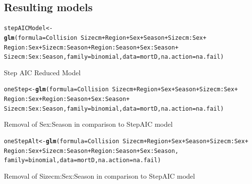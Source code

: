 \documentclass{article}\usepackage[]{graphicx}\usepackage[]{color}
\makeatletter
\newcommand{\hlopt}[1]{\textcolor[rgb]{0,0,0}{#1}}%
\newcommand{\hlstd}[1]{\textcolor[rgb]{0.345,0.345,0.345}{#1}}%
\newcommand{\hlkwb}[1]{\textcolor[rgb]{0.69,0.353,0.396}{#1}}%
\newcommand{\hlkwc}[1]{\textcolor[rgb]{0.333,0.667,0.333}{#1}}%
\newcommand{\hlkwd}[1]{\textcolor[rgb]{0.737,0.353,0.396}{\textbf{#1}}}%
\newenvironment{kframe}{%
 \def\at@end@of@kframe{}%
 \ifinner\ifhmode%
  \def\at@end@of@kframe{\end{minipage}}%
  \begin{minipage}{\columnwidth}%
 \fi\fi%
 \def\FrameCommand##1{\hskip\@totalleftmargin \hskip-\fboxsep
 \colorbox{shadecolor}{##1}\hskip-\fboxsep
     \hskip-\linewidth \hskip-\@totalleftmargin \hskip\columnwidth}%
 \MakeFramed {\advance\hsize-\width
   \@totalleftmargin\z@ \linewidth\hsize
   \@setminipage}}%
 {\par\unskip\endMakeFramed%
 \at@end@of@kframe}
\newenvironment{knitrout}{}{} %
\makeatother
\begin{document}
\subsection*{Resulting models}
\begin{knitrout}
\color{fgcolor}\begin{kframe}
\begin{alltt}
\hlstd{stepAICModel} \hlkwb{<-} \hlkwd{glm}\hlstd{(}\hlkwc{formula} \hlstd{= Collision} \hlopt{~} \hlstd{Sizecm} \hlopt{+} \hlstd{Region} \hlopt{+} \hlstd{Sex} \hlopt{+} \hlstd{Season} \hlopt{+} \hlstd{Sizecm}\hlopt{:}\hlstd{Sex} \hlopt{+}
      \hlstd{Region}\hlopt{:}\hlstd{Sex} \hlopt{+} \hlstd{Sizecm}\hlopt{:}\hlstd{Season} \hlopt{+} \hlstd{Region}\hlopt{:}\hlstd{Season} \hlopt{+} \hlstd{Sex}\hlopt{:}\hlstd{Season} \hlopt{+}
      \hlstd{Sizecm}\hlopt{:}\hlstd{Sex}\hlopt{:}\hlstd{Season,} \hlkwc{family} \hlstd{= binomial,} \hlkwc{data} \hlstd{= mortD,} \hlkwc{na.action} \hlstd{= na.fail)}
\end{alltt}
\end{kframe}
\end{knitrout}
Step AIC Reduced Model
\begin{knitrout}
\color{fgcolor}\begin{kframe}
\begin{alltt}
\hlstd{oneStep}  \hlkwb{<-} \hlkwd{glm}\hlstd{(}\hlkwc{formula} \hlstd{= Collision} \hlopt{~} \hlstd{Sizecm} \hlopt{+} \hlstd{Region} \hlopt{+} \hlstd{Sex} \hlopt{+} \hlstd{Season} \hlopt{+} \hlstd{Sizecm}\hlopt{:}\hlstd{Sex} \hlopt{+}
                  \hlstd{Region}\hlopt{:}\hlstd{Sex} \hlopt{+} \hlstd{Region}\hlopt{:}\hlstd{Season} \hlopt{+} \hlstd{Sex}\hlopt{:}\hlstd{Season} \hlopt{+}
                  \hlstd{Sizecm}\hlopt{:}\hlstd{Sex}\hlopt{:}\hlstd{Season,} \hlkwc{family} \hlstd{= binomial,} \hlkwc{data} \hlstd{= mortD,} \hlkwc{na.action} \hlstd{= na.fail)}
\end{alltt}
\end{kframe}
\end{knitrout}
Removal of Sex:Season in comparison to StepAIC model
\begin{knitrout}
\color{fgcolor}\begin{kframe}
\begin{alltt}
\hlstd{oneStepAlt} \hlkwb{<-} \hlkwd{glm}\hlstd{(}\hlkwc{formula} \hlstd{= Collision} \hlopt{~} \hlstd{Sizecm} \hlopt{+} \hlstd{Region} \hlopt{+} \hlstd{Sex} \hlopt{+} \hlstd{Season} \hlopt{+} \hlstd{Sizecm}\hlopt{:}\hlstd{Sex} \hlopt{+}
                  \hlstd{Region}\hlopt{:}\hlstd{Sex} \hlopt{+} \hlstd{Sizecm}\hlopt{:}\hlstd{Season} \hlopt{+} \hlstd{Region}\hlopt{:}\hlstd{Season} \hlopt{+} \hlstd{Sex}\hlopt{:}\hlstd{Season ,}
                  \hlkwc{family} \hlstd{= binomial,} \hlkwc{data} \hlstd{= mortD,} \hlkwc{na.action} \hlstd{= na.fail)}
\end{alltt}
\end{kframe}
\end{knitrout}
Removal of Sizecm:Sex:Season in comparison to StepAIC model
\end{document}
